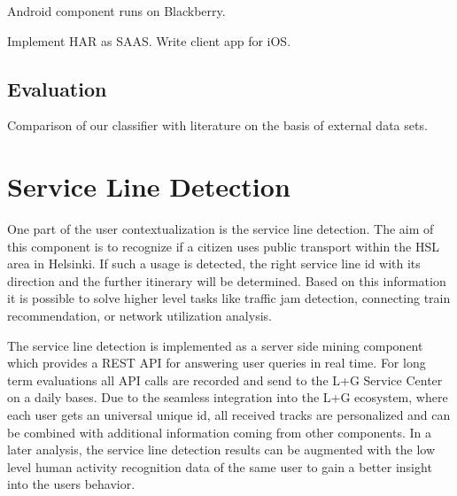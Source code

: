 \documentclass[external]{20120615_deliverable_template_ukob}
\theoremstyle{definition}
\begin{document}
Android component runs on Blackberry. 

Implement HAR as SAAS. Write client app for iOS.

\subsection{Evaluation}
Comparison of our classifier with literature on the basis of external
data sets.

\section{Service Line Detection}

One part of the user contextualization is the service line detection. The aim of this component is to recognize if a citizen uses public transport within the HSL area in Helsinki. If such a usage is detected, the right service line id with its direction and the further itinerary will be determined. Based on this information it is possible to solve higher level tasks like traffic jam detection, connecting train recommendation, or network utilization analysis.

The service line detection is implemented as a server side mining component which provides a REST API for answering user queries in real time. For long term evaluations all API calls are recorded and send to the L+G Service Center on a daily bases. Due to the seamless integration into the L+G ecosystem, where each user gets an universal unique id, all received tracks are personalized and can be combined with additional information coming from other components. In a later analysis, the service line detection results can be augmented with the low level human activity recognition data of the same user to gain a better insight into the users behavior.
\end{document}
